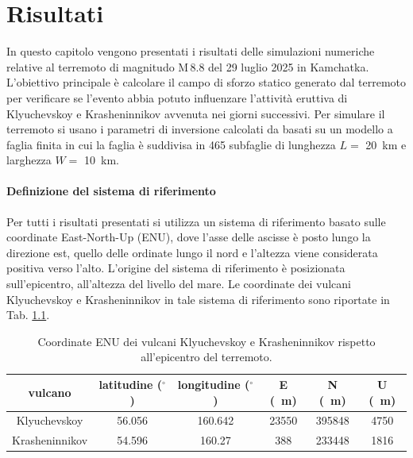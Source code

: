 \chapter{Risultati}

In questo capitolo vengono presentati i risultati delle simulazioni numeriche relative al terremoto di magnitudo \(\mathrm{M}\,8.8\) del 29 luglio 2025 in Kamchatka. L'obiettivo principale è calcolare il campo di sforzo statico generato dal terremoto per verificare se l'evento abbia potuto influenzare l'attività eruttiva di Klyuchevskoy e Krasheninnikov avvenuta nei giorni successivi. Per simulare il terremoto si usano i parametri di inversione calcolati da \citet{usgs2025qw60finitefault} basati su un modello a faglia finita in cui la faglia è suddivisa in \qty{465}{} subfaglie di lunghezza \(L= \) \qty{20}{\kilo\meter} e larghezza \(W= \) \qty{10}{\kilo\meter}. 

\subsubsection{Definizione del sistema di riferimento}
Per tutti i risultati presentati si utilizza un sistema di riferimento basato sulle coordinate East-North-Up (ENU), dove l'asse delle ascisse è posto lungo la direzione est, quello delle ordinate lungo il nord e l'altezza viene considerata positiva verso l'alto. L'origine del sistema di riferimento è posizionata sull'epicentro, all'altezza del livello del mare. Le coordinate dei vulcani Klyuchevskoy e Krasheninnikov in tale sistema di riferimento sono riportate in Tab. \ref{tab:coordinate_vulcani}.

\begin{table}[H]
    \centering
    \begin{tabular}{cccccc}
    \toprule
        vulcano & latitudine (\(^\circ\)) & longitudine (\(^\circ\)) & E (\qty{}{\meter}) & N (\qty{}{\meter}) & U (\qty{}{\meter}) \\
    \midrule
        Klyuchevskoy & \qty{56.056}{} & \qty{160.642}{} & \qty{23550}{} & \qty{395848}{} & \qty{4750}{} \\
        Krasheninnikov & \qty{54.596}{} & \qty{160.27}{} & \qty{388}{} & \qty{233448}{} & \qty{1816}{} \\
        
    \bottomrule
    \end{tabular}
    \caption{Coordinate ENU dei vulcani Klyuchevskoy e Krasheninnikov rispetto all'epicentro del terremoto.}
    \label{tab:coordinate_vulcani}
\end{table}

